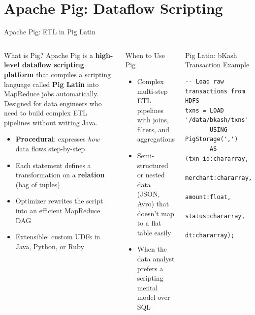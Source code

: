 \documentclass[aspectratio=169,10pt]{beamer}
\begin{document}
\section{Apache Pig: Dataflow Scripting}

\begin{frame}[fragile]{Apache Pig: ETL in Pig Latin}
  \begin{columns}[T]
      \begin{block}{What is Pig?}
        Apache Pig is a \textbf{high-level dataflow scripting platform} that compiles a scripting language called \textbf{Pig Latin} into MapReduce jobs automatically.  Designed for data engineers who need to build complex ETL pipelines without writing Java.
        \vspace{4pt}
        \begin{itemize}
          \item \textbf{Procedural}: expresses \emph{how} data flows step-by-step
          \item Each statement defines a transformation on a \textbf{relation} (bag of tuples)
          \item Optimizer rewrites the script into an efficient MapReduce DAG
          \item Extensible: custom UDFs in Java, Python, or Ruby
        \end{itemize}
      \end{block}
      \vspace{4pt}
      \begin{alertblock}{When to Use Pig}
        \begin{itemize}
          \small
          \item Complex multi-step ETL pipelines with joins, filters, and aggregations
          \item Semi-structured or nested data (JSON, Avro) that doesn't map to a flat table easily
          \item When the data analyst prefers a scripting mental model over SQL
        \end{itemize}
      \end{alertblock}

      \begin{exampleblock}{Pig Latin: bKash Transaction Example}
        \begin{lstlisting}[language={},
            title={Find top-5 merchants by total revenue}]
-- Load raw transactions from HDFS
txns = LOAD '/data/bkash/txns'
       USING PigStorage(',')
       AS (txn_id:chararray,
           merchant:chararray,
           amount:float,
           status:chararray,
           dt:chararray);


\end{lstlisting}
\end{exampleblock}
\end{columns}
\end{frame}
\end{document}
